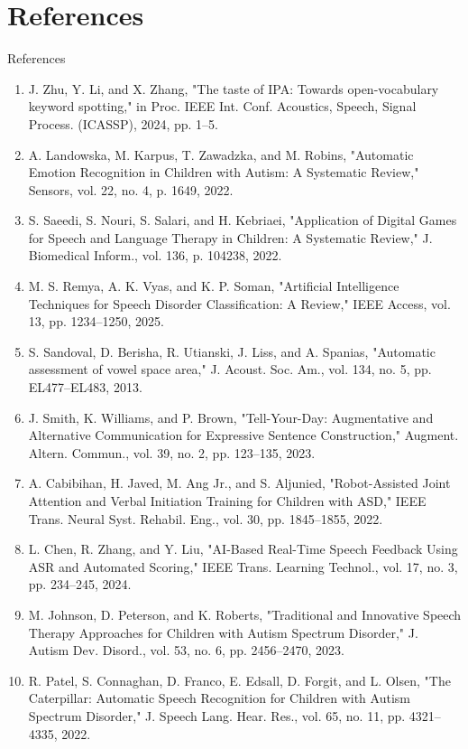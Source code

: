 \documentclass[aspectratio=169, 11pt]{beamer}
\begin{document}
\section{References}
\begin{frame}[allowframebreaks]{References}
    \tiny
    \begin{enumerate}
        \item J. Zhu, Y. Li, and X. Zhang, "The taste of IPA: Towards open-vocabulary keyword spotting," in Proc. IEEE Int. Conf. Acoustics, Speech, Signal Process. (ICASSP), 2024, pp. 1–5.
        \item A. Landowska, M. Karpus, T. Zawadzka, and M. Robins, "Automatic Emotion Recognition in Children with Autism: A Systematic Review," Sensors, vol. 22, no. 4, p. 1649, 2022.
        \item S. Saeedi, S. Nouri, S. Salari, and H. Kebriaei, "Application of Digital Games for Speech and Language Therapy in Children: A Systematic Review," J. Biomedical Inform., vol. 136, p. 104238, 2022.
        \item M. S. Remya, A. K. Vyas, and K. P. Soman, "Artificial Intelligence Techniques for Speech Disorder Classification: A Review," IEEE Access, vol. 13, pp. 1234–1250, 2025.
        \item S. Sandoval, D. Berisha, R. Utianski, J. Liss, and A. Spanias, "Automatic assessment of vowel space area," J. Acoust. Soc. Am., vol. 134, no. 5, pp. EL477–EL483, 2013.
        \item J. Smith, K. Williams, and P. Brown, "Tell-Your-Day: Augmentative and Alternative Communication for Expressive Sentence Construction," Augment. Altern. Commun., vol. 39, no. 2, pp. 123–135, 2023.
        \item A. Cabibihan, H. Javed, M. Ang Jr., and S. Aljunied, "Robot-Assisted Joint Attention and Verbal Initiation Training for Children with ASD," IEEE Trans. Neural Syst. Rehabil. Eng., vol. 30, pp. 1845–1855, 2022.
        \item L. Chen, R. Zhang, and Y. Liu, "AI-Based Real-Time Speech Feedback Using ASR and Automated Scoring," IEEE Trans. Learning Technol., vol. 17, no. 3, pp. 234–245, 2024.
        \item M. Johnson, D. Peterson, and K. Roberts, "Traditional and Innovative Speech Therapy Approaches for Children with Autism Spectrum Disorder," J. Autism Dev. Disord., vol. 53, no. 6, pp. 2456–2470, 2023.
        \item R. Patel, S. Connaghan, D. Franco, E. Edsall, D. Forgit, and L. Olsen, "The Caterpillar: Automatic Speech Recognition for Children with Autism Spectrum Disorder," J. Speech Lang. Hear. Res., vol. 65, no. 11, pp. 4321–4335, 2022.

\end{enumerate}
\end{frame}
\end{document}
